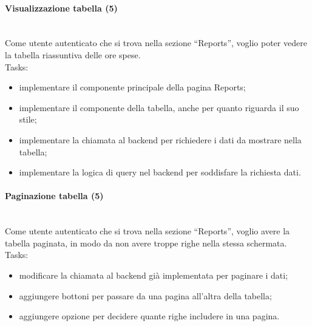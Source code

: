\paragraph{Visualizzazione tabella (5)}\mbox{} \\[\baselineskip]
\noindent Come utente autenticato che si trova nella sezione “Reports”, voglio poter vedere la tabella riassuntiva delle ore spese. \\

\noindent Tasks:

\begin{itemize}
  \item implementare il componente principale della pagina Reports;
  \item implementare il componente della tabella, anche per quanto riguarda il suo stile;
  \item implementare la chiamata al backend per richiedere i dati da mostrare nella tabella;
  \item implementare la logica di query nel backend per soddisfare la richiesta dati.
\end{itemize}

\paragraph{Paginazione tabella (5)}\mbox{} \\[\baselineskip]
\noindent Come utente autenticato che si trova nella sezione “Reports”, voglio avere la tabella paginata, in modo da non avere troppe righe nella stessa schermata. \\

\noindent Tasks:

\begin{itemize}
  \item modificare la chiamata al backend già implementata per paginare i dati;
  \item aggiungere bottoni per passare da una pagina all'altra della tabella;
  \item aggiungere opzione per decidere quante righe includere in una pagina.
\end{itemize}

